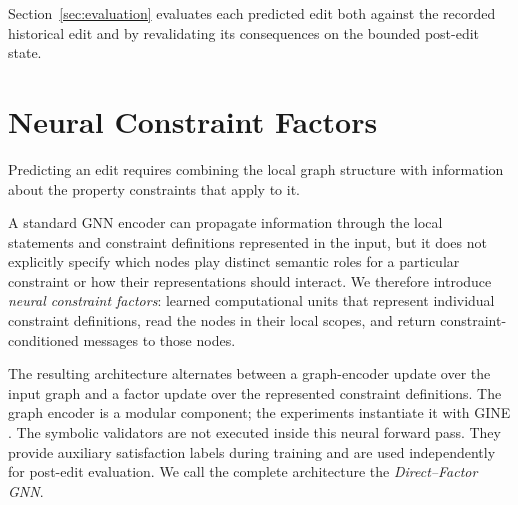 \documentclass[a4paper,UKenglish,cleveref,autoref,thm-restate]{tgdk-v2021}
\begin{document}

Section~\ref{sec:evaluation} evaluates each predicted edit both against the recorded historical edit and by revalidating its consequences on the bounded post-edit state.

\section{Neural Constraint Factors}
\label{sec:neural-constraint-factors}

Predicting an edit requires combining the local graph structure with information about the property constraints that apply to it. 

A standard GNN encoder can propagate information through the local statements and constraint definitions represented in the input, but it does not explicitly specify which nodes play distinct semantic roles for a particular constraint or how their representations should interact. We therefore introduce \emph{neural constraint factors}: learned computational units that represent individual constraint definitions, read the nodes in their local scopes, and return constraint-conditioned messages to those nodes.

The resulting architecture alternates between a graph-encoder update over the input graph and a factor update over the represented constraint definitions. The graph encoder is a modular component; the experiments instantiate it with GINE \cite{xu2019gin,hu2020gine}. The symbolic validators are not executed inside this neural forward pass. They provide auxiliary satisfaction labels during training and are used independently for post-edit evaluation. We call the complete architecture the \emph{Direct--Factor GNN}.
\end{document}
